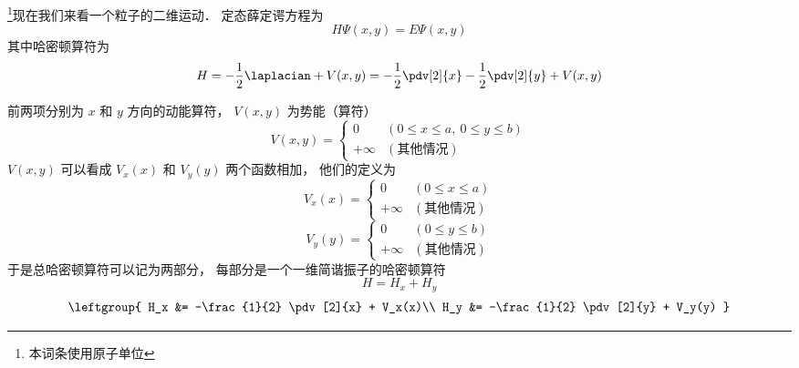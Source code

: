 

\footnote{本词条使用原子单位}现在我们来看一个粒子的二维运动． 定态薛定谔方程为
\begin{equation}\label{ISW2D_eq1}
H \Psi(x, y) = E \Psi(x, y)
\end{equation}
其中哈密顿算符为
\begin{equation}
H = -\frac{1}{2} \laplacian + V(x, y) =  -\frac{1}{2} \pdv[2]{x} -\frac{1}{2} \pdv[2]{y}  + V(x, y)
\end{equation}

前两项分别为 $x$ 和 $y$ 方向的动能算符， $V(x, y)$ 为势能（算符）
\begin{equation}
V(x, y) =
\begin{cases}
0  & (0 \leqslant x \leqslant a,\: 0 \leqslant y \leqslant b)\\
+\infty & (\text{其他情况})
\end{cases}
\end{equation}
$V(x, y)$ 可以看成 $V_x(x)$ 和 $V_y(y)$ 两个函数相加， 他们的定义为
\begin{equation}
V_x(x) =
\begin{cases}
0  & (0 \leqslant x \leqslant a)\\
+\infty & (\text{其他情况})
\end{cases}
\end{equation}
\begin{equation}
V_y(y) =
\begin{cases}
0  & (0 \leqslant y \leqslant b)\\
+\infty & (\text{其他情况})
\end{cases}
\end{equation}
于是总哈密顿算符可以记为两部分， 每部分是一个一维简谐振子的哈密顿算符
\begin{equation}
H = H_x + H_y
\end{equation}
\begin{equation}
\leftgroup{
H_x &= -\frac{1}{2} \pdv[2]{x} + V_x(x)\\
H_y &= -\frac{1}{2} \pdv[2]{y} + V_y(y)
}
\end{equation}

